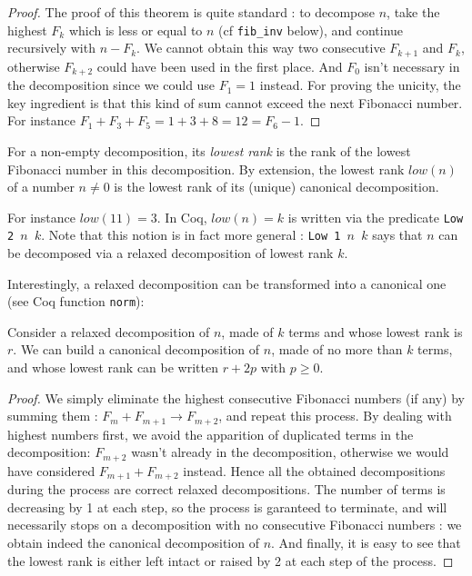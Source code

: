 \documentclass[a4paper,11pt]{article}
\begin{document}
\begin{proof}
The proof of this theorem is quite standard : to decompose
$n$, take the highest $F_k$ which is less or equal to $n$
(cf {\tt fib\_inv} below),
and continue recursively with $n-F_k$. We cannot obtain this way
two consecutive $F_{k+1}$ and $F_k$, otherwise $F_{k+2}$ could have
been used in the first place. And $F_0$ isn't necessary in the
decomposition since we could use $F_1 = 1$ instead.
For proving the unicity, the key ingredient is that this kind of
sum cannot exceed the next Fibonacci number. For instance
$F_1+F_3+F_5 = 1+3+8 = 12 = F_6 - 1$.
\end{proof}

\begin{definition}
For a non-empty decomposition, its \emph{lowest rank} is the rank of
the lowest Fibonacci number in this decomposition. By extension,
the lowest rank $low(n)$ of a number $n\neq 0$ is the lowest
rank of its (unique) canonical decomposition.
\end{definition}
For instance $low(11)=3$. In Coq, $low(n)=k$ is written
via the predicate {\tt Low 2 $n$ $k$}. Note that this notion is
in fact more general : {\tt Low 1 $n$ $k$} says that $n$ can be
decomposed via a relaxed decomposition of lowest rank $k$.

Interestingly, a relaxed decomposition can be transformed into
a canonical one (see Coq function {\tt norm}):

\begin{theorem}[normalisation]
Consider a relaxed decomposition of $n$, made of $k$ terms and
whose lowest rank is $r$. We can build a canonical decomposition
of $n$, made of no more than $k$ terms, and whose lowest rank can
be written $r+2p$ with $p\ge 0$.  
\end{theorem}
\begin{proof}
We simply eliminate the highest consecutive Fibonacci numbers (if any)
by summing them : $F_m+F_{m+1} \to F_{m+2}$, and repeat this
process. By dealing with highest numbers first, we avoid the apparition of
duplicated terms in the decomposition: $F_{m+2}$ wasn't already
in the decomposition, otherwise we would have considered
$F_{m+1}+F_{m+2}$ instead. Hence all the obtained decompositions
during the process are correct relaxed decompositions. The number of
terms is decreasing by 1 at each step, so the process is garanteed to
terminate, and will necessarily stops on a decomposition with no
consecutive Fibonacci numbers : we obtain indeed the canonical
decomposition of $n$. And finally, it is easy to see that the
lowest rank is either left intact or raised by 2 at each step
of the process.
\end{proof}
\end{document}
